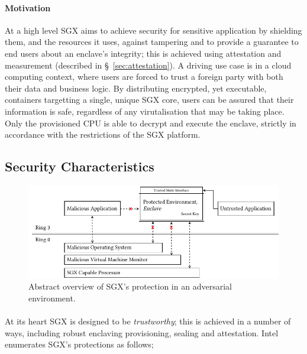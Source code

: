 \paragraph{Motivation} At a high level SGX aims to achieve security for sensitive application by shielding them, and the resources it uses, against tampering and to provide a guarantee to end users about an enclave's integrity; this is achieved using attestation and measurement (described in §~\ref{sec:attestation}). A driving use case is in a cloud computing context, where users are forced to trust a foreign party with both their data and business logic. By distributing encrypted, yet executable, containers targetting a single, unique SGX core, users can be assured that their information is safe, regardless of any virutalisation that may be taking place. Only the provisioned CPU is able to decrypt and execute the enclave, strictly in accordance with the restrictions of the SGX platform.

\subsection{Security Characteristics}

\begin{figure}[]
    \centering
    \includegraphics[width=0.95\linewidth]{figures/SGX-architecture.pdf}
    \caption{Abstract overview of SGX's protection in an adversarial environment.}
    \label{fig:sgx-basic}
\end{figure}

\paragraph{} At its heart SGX is designed to be \textit{trustworthy}; this is achieved in a number of ways, including robust enclaving provisioning, sealing and attestation. Intel enumerates SGX's protections as follows;

